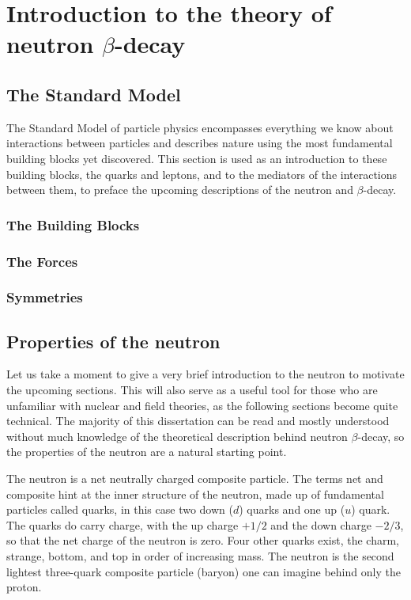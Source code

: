 \chapter{Introduction to the theory of neutron $\beta$-decay}
\label{ch:Introduction}


\section{The Standard Model}
The Standard Model of particle physics encompasses everything we know about
interactions between particles and describes nature using the most fundamental
building blocks yet discovered. This section is used as an introduction
to these building blocks, the quarks and leptons, and to the mediators of the
interactions between them, to preface the upcoming descriptions of the neutron
and $\beta$-decay.

\subsection{The Building Blocks}

\subsection{The Forces}

\subsection{Symmetries}

\section{Properties of the neutron}
\label{sec:neutronProperties}
Let us take a moment to give a very brief introduction to the neutron to motivate the
upcoming sections. This will also serve as a useful tool for those who are
unfamiliar with nuclear and field theories, as the following sections become
quite technical. The majority of this dissertation can be read and mostly understood
without much knowledge of the theoretical description behind neutron $\beta$-decay,
so the properties of the neutron are a natural starting point.

The neutron is a net neutrally charged composite particle. The terms net and
composite hint at the inner structure of the neutron, made up of fundamental
particles called quarks, in this case two down ($d$) quarks and one up ($u$) quark.
The quarks do carry charge, with the up charge $+1/2$ and the down charge
$-2/3$, so that the net charge of the neutron is zero. Four other quarks exist,
the charm, strange, bottom, and top in order of increasing mass. The neutron
is the second lightest three-quark composite particle (baryon) one can imagine
behind only the proton.

